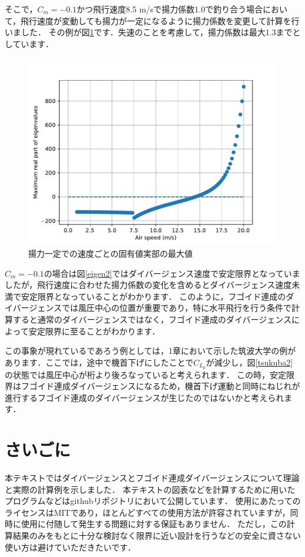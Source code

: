 \documentclass{jarticle}
\begin{document}
そこで，$C_m=-0.1$かつ飛行速度8.5 m/sで揚力係数1.0で釣り合う場合において，飛行速度が変動しても揚力が一定になるように揚力係数を変更して計算を行いました．
その例が図\ref{eigen3}です．失速のことを考慮して，揚力係数は最大1.3までとしています．
\begin{figure}[H]
    \centering
    \includegraphics[width=0.7\linewidth]{image/Eigenvalues_of_phugoid-divergence-modal-varCL-0.1.pdf}
    \caption{揚力一定での速度ごとの固有値実部の最大値}
    \label{eigen3}
\end{figure}
$C_m=-0.1$の場合は図\ref{eigen2}ではダイバージェンス速度で安定限界となっていましたが，飛行速度に合わせた揚力係数の変化を含めるとダイバージェンス速度未満で安定限界となっていることがわかります．
このように，フゴイド連成のダイバージェンスでは風圧中心の位置が重要であり，特に水平飛行を行う条件で計算すると通常のダイバージェンスではなく，フゴイド連成のダイバージェンスによって安定限界に至ることがわかります．

この事象が現れているであろう例としては，1章において示した筑波大学の例があります．ここでは，途中で機首下げにしたことで$C_{L_0}$が減少し，図\ref{tsukuba2}の状態では風圧中心が桁より後ろなっていると考えられます．
この時，安定限界はフゴイド連成ダイバージェンスになるため，機首下げ運動と同時にねじれが進行するフゴイド連成のダイバージェンスが生じたのではないかと考えられます．

\section{さいごに}

本テキストではダイバージェンスとフゴイド連成ダイバージェンスについて理論と実際の計算例を示しました．
本テキストの図表などを計算するために用いたプログラムなどはgithubリポジトリ\cite{git}において公開しています．
使用にあたってのライセンスはMITであり，ほとんどすべての使用方法が許容されていますが，同時に使用に付随して発生する問題に対する保証もありません．
ただし，この計算結果のみをもとに十分な検討なく限界に近い設計を行うなどの安全に資さない使い方は避けていただきたいです．
\end{document}
